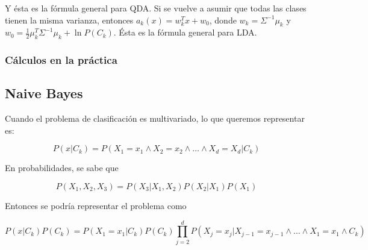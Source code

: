 Y ésta es la fórmula general para QDA. Si se vuelve a asumir que todas las clases tienen la misma varianza, entonces $a_k(x) = w_k^Tx + w_0$, donde $w_k = \Sigma^{-1}\mu_k$ y $w_0 = \frac{1}{2}\mu_k^T\Sigma^{-1}\mu_k + \ln P(C_k)$. Ésta es la fórmula general para LDA.

\subsubsection{Cálculos en la práctica}



\subsection{Naive Bayes}
Cuando el problema de clasificación es multivariado, lo que queremos representar es:

\begin{equation*}
    P(x | C_k) = P(X_1 = x_1 \wedge X_2 = x_2 \wedge \dots \wedge X_d = X_d | C_k)
\end{equation*}

En probabilidades, se sabe que

\begin{equation*}
    P(X_1,X_2,X_3) = P(X_3 | X_1,X_2) P(X_2 | X_1) P(X_1)
\end{equation*}

Entonces se podría representar el problema como

\begin{equation*}
    P(x | C_k )P(C_k) =
    P(X_1 = x_1 | C_k)P(C_k)
    \prod_{j = 2}^{d} P(X_j = x_j | X_{j - 1} = x_{j - 1} \wedge \dots \wedge X_1 = x_1 \wedge C_k)
\end{equation*}
